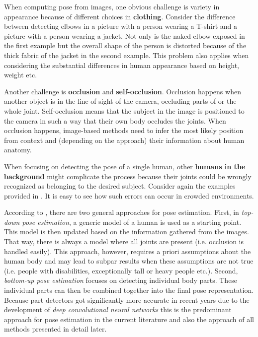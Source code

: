 When computing pose from images, one obvious challenge is variety in appearance because of different choices in \textbf{clothing}.
Consider the difference between detecting elbows in a picture with a person wearing a T-shirt and a picture with a person wearing a jacket.
Not only is the naked elbow exposed in the first example but the overall shape of the person is distorted because of the thick fabric of the jacket in the second example.
This problem also applies when considering the substantial differences in human appearance based on height, weight etc.

Another challenge is \textbf{occlusion} and \textbf{self-occlusion}. Occlusion happens when another object is in the line of sight of the camera, occluding parts of or the whole joint.
Self-occlusion means that the subject in the image is positioned to the camera in such a way that their own body occludes the joints.
When occlusion happens, image-based methods need to infer the most likely position from context and (depending on the approach) their information about human anatomy.

When focusing on detecting the pose of a single human, other \textbf{humans in the background} might complicate the process because their joints could be wrongly recognized as belonging to the desired subject.
Consider again the examples provided in .
It is easy to see how such errors can occur in crowded environments.

According to \cite{zhu_articulated_2016}, there are two general approaches for pose estimation.
First, in \textit{top-down pose estimation}, a generic model of a human is used as a starting point.
This model is then updated based on the information gathered from the images.
That way, there is always a model where all joints are present (i.e. occlusion is handled easily).
This approach, however, requires a priori assumptions about the human body and may lead to subpar results when these assumptions are not true (i.e. people with disabilities, exceptionally tall or heavy people etc.).
Second, \textit{bottom-up pose estimation} focuses on detecting individual body parts.
These individual parts can then be combined together into the final pose representation.
Because part detectors got significantly more accurate in recent years due to the development of \textit{deep convolutional neural networks} this is the predominant approach for pose estimation in the current literature and also the approach of all methods presented in detail later.

